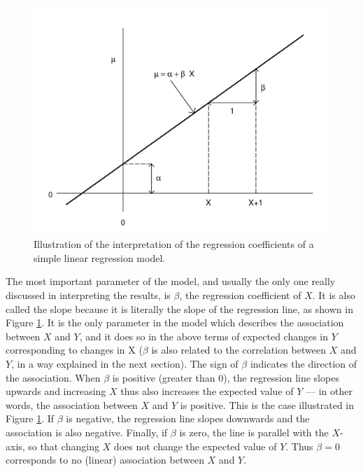 \begin{figure}
\caption{Illustration of the interpretation of the regression
coefficients of a simple linear regression model.}
\label{f_linmod_params}

\begin{center}
\includegraphics[width=12.5cm]{lmparams}
\end{center}

\end{figure}

The most important parameter of the model, and usually the only one
really discussed in interpreting the results, is $\beta$, the regression
coefficient of $X$. It is also called the slope because it is literally
the slope of the regression line, as shown in Figure
\ref{f_linmod_params}. It is the only parameter in the model which
describes the association between $X$ and $Y$, and it does so in the
above terms of expected changes in $Y$ corresponding to changes in X
($\beta$ is also related to the correlation between $X$ and $Y$, in a
way explained in the next section). The sign of $\beta$ indicates the
direction of the association. When $\beta$ is positive (greater than 0),
the regression line slopes upwards and increasing $X$ thus also
increases the expected value of $Y$ --- in other words, the association
between $X$ and $Y$ is positive. This is the case illustrated in Figure
\ref{f_linmod_params}. If $\beta$ is negative, the regression line
slopes downwards and the association is also negative. Finally, if
$\beta$ is zero, the line is parallel with the $X$-axis, so that
changing $X$ does not change the expected value of $Y$. Thus
$\beta=0$ corresponds to no (linear) association between $X$ and $Y$.

